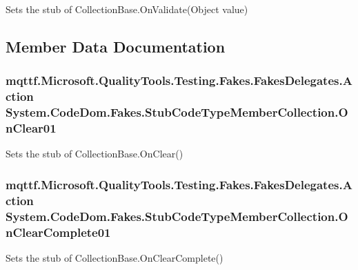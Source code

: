 Sets the stub of Collection\-Base.\-On\-Validate(\-Object value)



\subsection{Member Data Documentation}
\hypertarget{class_system_1_1_code_dom_1_1_fakes_1_1_stub_code_type_member_collection_a4eeaee70fcf5fc19f99c76dca5a2805f}{
\subsubsection[{On\-Clear01}]{\setlength{\rightskip}{0pt plus 5cm}mqttf.\-Microsoft.\-Quality\-Tools.\-Testing.\-Fakes.\-Fakes\-Delegates.\-Action System.\-Code\-Dom.\-Fakes.\-Stub\-Code\-Type\-Member\-Collection.\-On\-Clear01}}\label{class_system_1_1_code_dom_1_1_fakes_1_1_stub_code_type_member_collection_a4eeaee70fcf5fc19f99c76dca5a2805f}


Sets the stub of Collection\-Base.\-On\-Clear()

\hypertarget{class_system_1_1_code_dom_1_1_fakes_1_1_stub_code_type_member_collection_a35e74f630320472792d7b2caa2377bba}{
\subsubsection[{On\-Clear\-Complete01}]{\setlength{\rightskip}{0pt plus 5cm}mqttf.\-Microsoft.\-Quality\-Tools.\-Testing.\-Fakes.\-Fakes\-Delegates.\-Action System.\-Code\-Dom.\-Fakes.\-Stub\-Code\-Type\-Member\-Collection.\-On\-Clear\-Complete01}}\label{class_system_1_1_code_dom_1_1_fakes_1_1_stub_code_type_member_collection_a35e74f630320472792d7b2caa2377bba}


Sets the stub of Collection\-Base.\-On\-Clear\-Complete()

